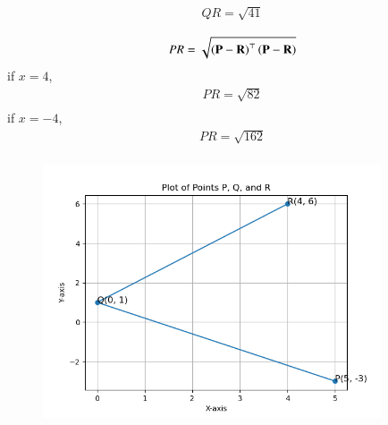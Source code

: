 \documentclass[journal]{IEEEtran}
\begin{document}
\begin{align}
    QR=\sqrt{41}\\
\end{align}
\begin{align}
    PR=\sqrt{\left(\mathbf{P}-\mathbf{R}\right)^\top\left(\mathbf{P}-\mathbf{R}\right)}\\
\end{align}
if $x=4$,
\begin{align}
    PR=\sqrt{82}\\
\end{align}
if $x=-4$,
\begin{align}
    PR=\sqrt{162}\\
\end{align}
\begin{figure}[htp]
    \centering
    \includegraphics[width=10cm]{figs/Figure_1.png}
    \label{fig:enter-label}
\end{figure}
\end{document}
